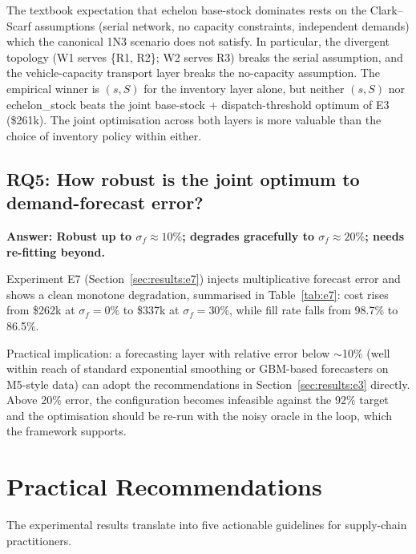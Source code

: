 The textbook expectation that echelon base-stock dominates rests on the
Clark--Scarf assumptions (serial network, no capacity constraints,
independent demands) which the canonical 1N3 scenario does not satisfy.
In particular, the divergent topology (W1 serves \{R1, R2\}; W2 serves
R3) breaks the serial assumption, and the vehicle-capacity transport
layer breaks the no-capacity assumption.  The empirical winner is
$(s,S)$ for the inventory layer alone, but neither $(s,S)$ nor
echelon\_stock beats the joint base-stock + dispatch-threshold optimum
of E3 (\$261k).  The joint optimisation across both layers is more
valuable than the choice of inventory policy within either.

\subsection{RQ5: How robust is the joint optimum to demand-forecast error?}

\textbf{Answer: Robust up to $\sigma_f \approx 10\%$; degrades gracefully
to $\sigma_f \approx 20\%$; needs re-fitting beyond.}

Experiment E7 (Section~\ref{sec:results:e7}) injects multiplicative
forecast error and shows a clean monotone degradation, summarised
in Table~\ref{tab:e7}: cost rises from \$262k at $\sigma_f = 0\%$
to \$337k at $\sigma_f = 30\%$, while fill rate falls from 98.7\%
to 86.5\%.

Practical implication: a forecasting layer with relative error below
$\sim$10\% (well within reach of standard exponential smoothing or
GBM-based forecasters on M5-style data) can adopt the recommendations
in Section~\ref{sec:results:e3} directly.  Above 20\% error, the
configuration becomes infeasible against the 92\% target and the
optimisation should be re-run with the noisy oracle in the loop, which
the framework supports.

\section{Practical Recommendations}
\label{sec:disc:recommendations}

The experimental results translate into five actionable guidelines for
supply-chain practitioners.

